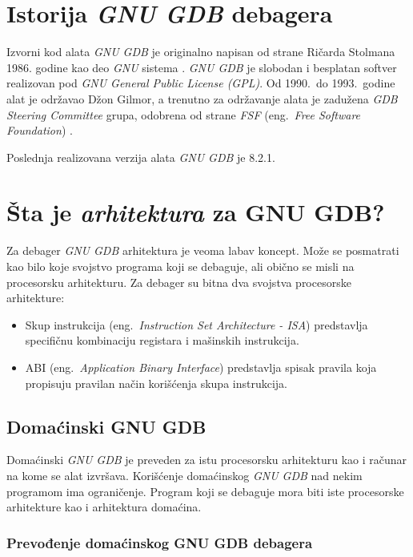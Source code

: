 \documentclass[12pt,oneside]{memoir}
\begin{document}
\section{Istorija \emph{GNU GDB} debagera}

Izvorni kod alata \emph{GNU GDB} je originalno napisan od strane Ričarda Stolmana 1986. godine kao deo \emph{GNU} sistema \cite{GDBDOC}. \emph{GNU GDB} je slobodan i besplatan softver realizovan pod \emph{GNU General Public License (GPL)}. Od 1990.~do 1993.~godine alat je održavao Džon Gilmor, a trenutno za održavanje alata je zadužena \emph{GDB Steering Committee} grupa, odobrena od strane \emph{FSF} (eng.~\emph{Free Software Foundation}) \cite{FSF}.

Poslednja realizovana verzija alata \emph{GNU GDB} je 8.2.1.

\section{Šta je \emph{arhitektura} za GNU GDB?}

Za debager \emph{GNU GDB} arhitektura je veoma labav koncept. Može se posmatrati kao bilo koje svojstvo programa koji se debaguje, ali obično se misli na procesorsku arhitekturu. Za debager su bitna dva svojstva procesorske arhitekture:

\begin{itemize}
	\item Skup instrukcija (eng.~\emph{Instruction Set Architecture - ISA}) predstavlja specifičnu kombinaciju registara i mašinskih instrukcija.
	\item ABI (eng.~\emph{Application Binary Interface}) predstavlja spisak pravila koja propisuju pravilan način korišćenja skupa instrukcija.
\end{itemize}

\subsection{Domaćinski GNU GDB}

Domaćinski \emph{GNU GDB} je preveden za istu procesorsku arhitekturu kao i računar na kome se alat izvršava. Korišćenje domaćinskog \emph{GNU GDB} nad nekim programom ima ograničenje. Program koji se debaguje mora biti iste procesorske arhitekture kao i arhitektura domaćina.

\subsubsection{Prevođenje domaćinskog GNU GDB debagera}
\end{document}
